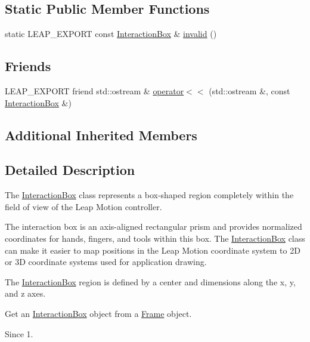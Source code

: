 \subsection*{Static Public Member Functions}
\begin{DoxyCompactItemize}
\item 
static L\+E\+A\+P\+\_\+\+E\+X\+P\+O\+RT const \hyperlink{class_leap_1_1_interaction_box}{Interaction\+Box} \& \hyperlink{class_leap_1_1_interaction_box_af3d181a4077f0b7e7334e3eb4db4b019}{invalid} ()
\end{DoxyCompactItemize}
\subsection*{Friends}
\begin{DoxyCompactItemize}
\item 
L\+E\+A\+P\+\_\+\+E\+X\+P\+O\+RT friend std\+::ostream \& \hyperlink{class_leap_1_1_interaction_box_a35cb230346cbaebc7c2a7dca7917c89e}{operator$<$$<$} (std\+::ostream \&, const \hyperlink{class_leap_1_1_interaction_box}{Interaction\+Box} \&)
\end{DoxyCompactItemize}
\subsection*{Additional Inherited Members}


\subsection{Detailed Description}
The \hyperlink{class_leap_1_1_interaction_box}{Interaction\+Box} class represents a box-\/shaped region completely within the field of view of the Leap Motion controller.

The interaction box is an axis-\/aligned rectangular prism and provides normalized coordinates for hands, fingers, and tools within this box. The \hyperlink{class_leap_1_1_interaction_box}{Interaction\+Box} class can make it easier to map positions in the Leap Motion coordinate system to 2D or 3D coordinate systems used for application drawing.



The \hyperlink{class_leap_1_1_interaction_box}{Interaction\+Box} region is defined by a center and dimensions along the x, y, and z axes.

Get an \hyperlink{class_leap_1_1_interaction_box}{Interaction\+Box} object from a \hyperlink{class_leap_1_1_frame}{Frame} object. \begin{DoxySince}{Since}
1. 
\end{DoxySince}


